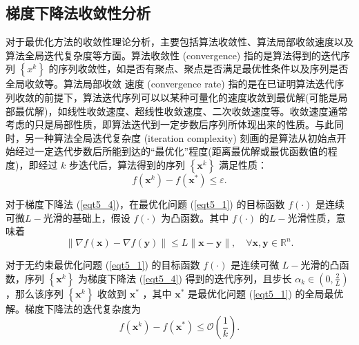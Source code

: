 \subsection{梯度下降法收敛性分析}
对于最优化方法的收敛性理论分析，主要包括算法收敛性、算法局部收敛速度以及算法全局迭代复杂度等方面\cite{2002ConvergenceAnalysis}。算法收敛性 (convergence) 指的是算法得到的迭代序列 $\left\{x^{k}\right\}$ 的序列收敛性，如是否有聚点、聚点是否满足最优性条件以及序列是否全局收敛等。算法局部收敛 速度 (convergence rate) 指的是在已证明算法迭代序列收敛的前提下，算法迭代序列可以以某种可量化的速度收敛到最优解(可能是局部最优解)，如线性收敛速度、超线性收敛速度、二次收敛速度等。收敛速度通常考虑的只是局部性质，即算法迭代到一定步数后序列所体现出来的性质。与此同时，另一种算法全局迭代复杂度 (iteration complexity) 刻画的是算法从初始点开始经过一定迭代步数后所能到达的“最优化”程度(距离最优解或最优函数值的程度)，即经过 $k$ 步迭代后，算法得到的序列 $\left\{\bm{x}^{k}\right\}$ 满足性质：
\begin{equation}
    f\left(\bm{x}^{k}\right)-f\left(\bm{x}^{*}\right) \leq \varepsilon .
    \label{eqt5_5}
\end{equation}
\par 对于梯度下降法 (\ref{eqt5_4})，在最优化问题 (\ref{eqt5_1}) 的目标函数 $f(\cdot)$ 是连续可微$L-$光滑的基础上，假设 $f(\cdot)$ 为凸函数。其中 $f(\cdot)$ 的$L-$光滑性质，意味着
\begin{equation}
    \|\nabla f(\bm{x})-\nabla f(\bm{y})\| \leq L\|\bm{x}-\bm{y}\|, \quad \forall \bm{x}, \bm{y} \in \mathbb{R}^{n} .
    \nonumber
\end{equation}

\begin{theorem}[收敛性]\label{thm1}
    对于无约束最优化问题 (\ref{eqt5_1}) 的目标函数 $f(\cdot)$ 是连续可微 $L-$光滑的凸函数，序列 $\left\{\bm{x}^{k}\right\}$ 为梯度下降法 (\ref{eqt5_4}) 得到的迭代序列，且步长 $\alpha_{k} \in\left(0, \frac{2}{L}\right)$ ，那么该序列 $\left\{\bm{x}^{k}\right\}$ 收敛到 $\bm{x}^{*}$ ，其中  $\bm{x}^{*}$ 是最优化问题 (\ref{eqt5_1}) 的全局最优解。梯度下降法的迭代复杂度为
    \begin{equation}
        f\left(\bm{x}^{k}\right)-f\left(\bm{x}^{*}\right) \leq \mathcal{O}\left(\frac{1}{k}\right) .
        \nonumber
    \end{equation}
\end{theorem}


